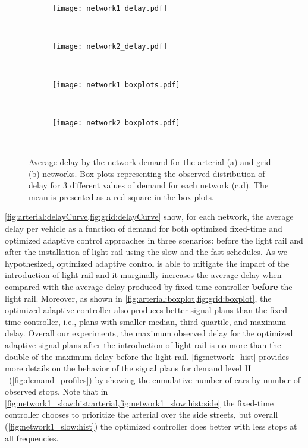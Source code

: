\begin{figure*}[t]
%
\centering
\begin{subfigure}{0.49\textwidth}\label{fig:arterial:delayCurve}
\texttt{[image: network1\_delay.pdf]}
\caption{~}
\end{subfigure}
\begin{subfigure}{0.49\textwidth}\label{fig:grid:delayCurve}
\texttt{[image: network2\_delay.pdf]}
\caption{~}
\end{subfigure}
\begin{subfigure}{0.49\textwidth}\label{fig:arterial:boxplot}
\texttt{[image: network1\_boxplots.pdf]}
\caption{~}
\end{subfigure}
\begin{subfigure}{0.49\textwidth}\label{fig:grid:boxplot}
\texttt{[image: network2\_boxplots.pdf]}
\caption{~}
\end{subfigure}
%
\caption{Average delay by the network demand for the arterial (a) and grid (b)
networks. Box plots representing the observed distribution of delay for 3
different values of demand for each network (c,d). The mean is presented as a
red square in the box plots.}
%
\label{fig:delayCurveAndBoxplot}
%
\end{figure*}


\cref{fig:arterial:delayCurve,fig:grid:delayCurve} show, for each network, the
average delay per vehicle as a function of demand for both optimized fixed-time and
optimized adaptive control approaches in three scenarios: before the light rail and after
the installation of light rail using the slow and the fast schedules.
%
As we hypothesized, optimized adaptive control is able to mitigate the impact of
the introduction of light rail and it marginally increases the average delay
when compared with the average delay produced by fixed-time controller
\textbf{before} the light rail.
%
Moreover, as shown in \cref{fig:arterial:boxplot,fig:grid:boxplot}, the
optimized adaptive controller also produces better signal plans than the
fixed-time controller, i.e., plans with smaller median, third quartile, and
maximum delay.
%
Overall our experiments, the maximum observed delay for the optimized adaptive
signal plans after the introduction of light rail is no more than
%
%
the double of the maximum delay before the light rail.
%
\cref{fig:network_hist} provides more details on the behavior of the signal
plans for demand level $\rm II$~(\cref{fig:demand_profiles}) by showing the
cumulative number of cars by number of observed stops.
%
Note that in \cref{fig:network1_slow:hist:arterial,fig:network1_slow:hist:side}
the fixed-time controller chooses to prioritize the arterial over the side
streets, but overall (\cref{fig:network1_slow:hist}) the optimized controller
does better with less stops at all frequencies.


